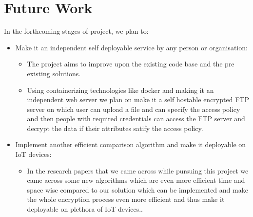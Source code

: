 \chapter*{Future Work}

In the forthcoming stages of project, we plan to:
\begin{itemize}
  \item Make it an independent self deployable service by any person or organisation:
  \begin{itemize}
      \item The project aims to improve upon the existing code base and the pre existing solutions.
      \item Using containerizing technologies like docker and making it an independent web server we plan on make it a self hostable encrypted FTP server on which user can upload a file and can specify the access policy and then people with required credentials can access the FTP server and decrypt the data if their attributes satify the access policy.
  \end{itemize}
  \item Implement another efficient comparison algorithm and make it deployable on IoT devices:
  \begin{itemize}
      \item In the research papers that we came across while pursuing this project we came across some new algorithms which are even more efficient time and space wise compared to our solution which can be implemented and make the whole encryption process even more efficient and thus make it deployable on plethora of IoT devices..
  \end{itemize}
\end{itemize}


